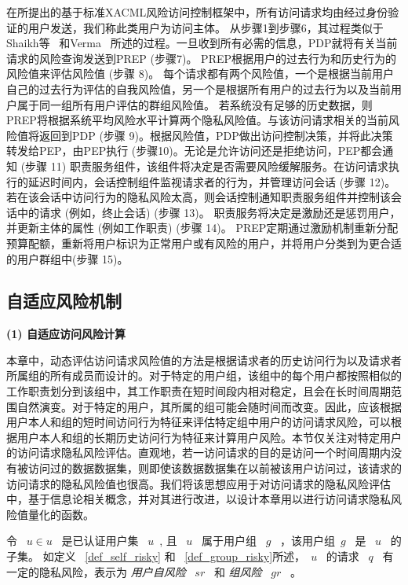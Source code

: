 在所提出的基于标准XACML风险访问控制框架中，所有访问请求均由经过身份验证的用户发送，我们称此类用户为访问主体。 从步骤1到步骤6，其过程类似于Shaikh等~\cite{shaikh2012dynamic} 和Verma ~\cite{verma2004xml}所述的过程。一旦收到所有必需的信息，PDP就将有关当前请求的风险查询发送到PREP (步骤7)。 PREP根据用户的过去行为和历史行为的风险值来评估风险值 (步骤 8)。 每个请求都有两个风险值，一个是根据当前用户自己的过去行为评估的自我风险值，另一个是根据所有用户的过去行为以及当前用户属于同一组所有用户评估的群组风险值。
若系统没有足够的历史数据，则PREP将根据系统平均风险水平计算两个隐私风险值。与该访问请求相关的当前风险值将返回到PDP (步骤 9)。根据风险值，PDP做出访问控制决策，并将此决策转发给PEP，由PEP执行 (步骤10)。无论是允许访问还是拒绝访问，PEP都会通知 (步骤 11) 职责服务组件，该组件将决定是否需要风险缓解服务。在访问请求执行的延迟时间内，会话控制组件监视请求者的行为，并管理访问会话 (步骤 12)。若在该会话中访问行为的隐私风险太高，则会话控制通知职责服务组件并控制该会话中的请求 (例如，终止会话) (步骤 13)。 职责服务将决定是激励还是惩罚用户，并更新主体的属性 (例如工作职责) (步骤 14)。 PREP定期通过激励机制重新分配预算配额，重新将用户标识为正常用户或有风险的用户，并将用户分类到为更合适的用户群组中(步骤 15)。

\subsection{自适应风险机制}
\label{subsec:risk values and decision}

\textbf{(1) 自适应访问风险计算}

本章中，动态评估访问请求风险值的方法是根据请求者的历史访问行为以及请求者所属组的所有成员而设计的。对于特定的用户组，该组中的每个用户都按照相似的工作职责划分到该组中，其工作职责在短时间段内相对稳定，且会在长时间周期范围自然演变。对于特定的用户，其所属的组可能会随时间而改变。因此，应该根据用户本人和组的短时间访问行为特征来评估特定组中用户的访问请求风险，可以根据用户本人和组的长期历史访问行为特征来计算用户风险。本节仅关注对特定用户的访问请求隐私风险评估。直观地，若一访问请求的目的是访问一个时间周期内没有被访问过的数据数据集，则即使该数据数据集在以前被该用户访问过，该请求的访问请求的隐私风险值也很高。我们将该思想应用于对访问请求的隐私风险评估中，基于信息论相关概念，并对其进行改进，以设计本章用以进行访问请求隐私风险值量化的函数。

令 ~$u \in u$~ 是已认证用户集 ~$u$~, 且 ~$u$~ 属于用户组 ~$g$~ ，该用户组~$g$~ 是 ~$u$~ 的子集。 如定义 ~\ref{def_self_risky} 和 ~\ref{def_group_risky}所述，~$u$~ 的请求 ~$q$~ 有一定的隐私风险，表示为 \emph{用户自风险} ~$sr$~ 和 \emph{组风险} ~$gr$~ 。


